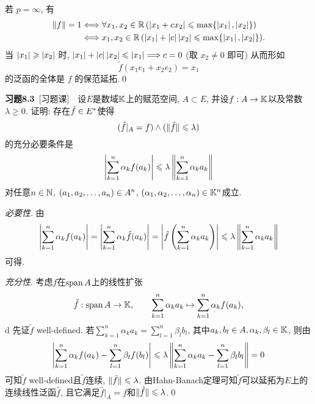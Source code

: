 \begin{Proof}
        若 $ p=\infty $, 有
        \[
            \begin{aligned}
                \lVert f\rVert=1& \Longleftrightarrow \forall x_{1}, x_{2}\in\mathbb{R}\,(\left| x_{1}+cx_{2} \right|  \leqslant\max\{ \left| x_{1} \right| , \left| x_{2} \right|  \})\\
                & \Longleftrightarrow x_{1}, x_{2}\in\mathbb{R}\,(\left| x_{1} \right| +\left| c \right| \left| x_{2} \right| \leqslant\max\{ \left| x_{1} \right| , \left| x_{2} \right|  \}).
            \end{aligned}    
        \]
        当 $ \left| x_{1} \right| \geqslant\left| x_{2} \right|  $ 时, $ \left| x_{1} \right| +\left| c \right| \left| x_{2} \right| \leqslant\left| x_{1} \right| \Longrightarrow c=0 $ (取 $ x_{2}\ne 0 $ 即可) 从而形如
        \[
            \tilde{f}(x_{1}e_{1}+x_{2}e_{2})=x_{1}
        \]
        的泛函的全体是 $ f $ 的保范延拓.\qed
    \end{Proof}

    \textbf{习题8.3}\ [习题课]\ \ 设$ E $是数域$ \mathbb{K} $上的赋范空间, $ A\subset E $, 并设$ f : A\to\mathbb{K} $以及常数$ \lambda\geqslant 0 $. 证明: 存在$ \hat{f}\in E^{*} $使得
    \[
    (\hat{f}\rvert_A=f)\land (\lVert \hat{f}\rVert\leqslant\lambda)
    \]
    的充分必要条件是
    \[
    \left| \sum_{k=1}^n\alpha_kf(a_k) \right| \leqslant\lambda\left\| \sum_{k=1}^n\alpha_ka_k \right\|
    \]
    对任意$ n\in\mathbb{N} $, $ (a_{1}, a_{2}, \dots, a_{n})\in A^n $, $ (\alpha_{1}, \alpha_{2}, \dots, \alpha_{n})\in\mathbb{K}^n $成立.
    \begin{Proof}
    \textsl{必要性}. 由
    \[
    \left| \sum_{k=1}^n\alpha_kf(a_k) \right| =\left| \sum_{k=1}^n\alpha_k\hat{f}(a_k) \right| =\left| \hat{f}\left( \sum_{k=1}^n\alpha_ka_k \right) \right| \leqslant\lambda\left\| \sum_{k=1}^n\alpha_ka_k \right\|
    \]
    可得.
    
    \textsl{充分性}. 考虑$ f $在$ \operatorname{span} A $上的线性扩张
    \[
    \tilde{f} : \operatorname{span} A\to\mathbb{K},\qquad \sum_{k=1}^n\alpha_ka_k\mapsto\sum_{k=1}^n\alpha_kf(a_k),
    \]d
    先证$ \tilde{f} $ well-defined. 若$ \sum\limits_{k=1}^n\alpha_ka_k=\sum\limits_{l=1}^n\beta_lb_l $, 其中$ a_k, b_l\in A, \alpha_{k}, \beta_{l}\in\mathbb{K} $, 则由
    \[
    \left| \sum_{k=1}^n\alpha_kf(a_k)-\sum_{l=1}^n\beta_lf(b_l) \right| \leqslant\lambda\left\| \sum_{k=1}^n\alpha_ka_k-\sum_{l=1}^n\beta_lb_l \right\|=0
    \]
    可知$ \tilde{f} $ well-defined且$ \tilde{f} $连续, $ \lVert \tilde{f}\rVert\leqslant\lambda $. 由Hahn-Banach定理可知$ \tilde{f} $可以延拓为$ E $上的连续线性泛函$ \hat{f} $, 且它满足$ \hat{f}\rvert_A=f $和$ \lVert \hat{f}\rVert\leqslant\lambda $.\qed
    \end{Proof}
    
